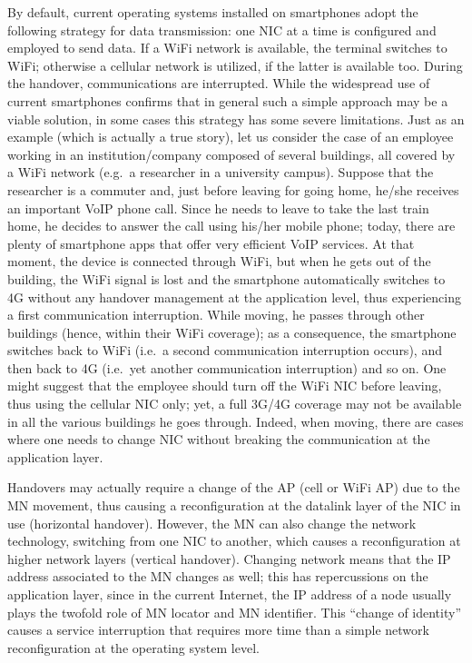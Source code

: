 \documentclass[preprint,12pt]{elsarticle}
\begin{document}
By default, current operating systems installed on smartphones adopt the following strategy for data transmission: one \ac{NIC} at a time is configured and employed 
to send data. If a WiFi network is available, the terminal switches to WiFi; otherwise a cellular network is 
utilized, if the latter is available too. 
During the handover, communications are interrupted. While the widespread use
of current smartphones confirms that in general such a simple approach may be a viable solution, in some cases this strategy has some severe limitations.
Just as an example (which is actually a true story), let us consider the case of an employee working in an institution/company composed of several buildings, all covered by a WiFi network (e.g.~a researcher in a university campus). 
Suppose that the researcher is a commuter and, just before leaving for going home, he/she receives an important \ac{VoIP} 
phone call. Since he needs to leave to take the last train home, he decides to answer the 
call using his/her mobile phone; today, there are plenty of smartphone apps that 
offer very efficient VoIP services.
At that moment, the device is connected through WiFi, but when he gets out of the 
building, the WiFi signal is lost and the smartphone automatically switches to 4G without any handover management at the application level, 
thus experiencing a first communication interruption.  
While moving, he passes through other buildings (hence, within their WiFi 
coverage); as a consequence, the smartphone switches back to WiFi 
(i.e.~a second communication interruption occurs), and then back to 4G 
(i.e.~yet another communication interruption) and so on. 
One might suggest that the employee should turn off the WiFi NIC before leaving, thus using the cellular NIC only; yet, a full 3G/4G coverage may not be available in all the various buildings he goes through.
Indeed, when moving, there are cases where one needs to change NIC without breaking the communication at the application layer.

Handovers may actually require a change of the \ac{AP} (cell or WiFi AP) due to the MN 
movement, thus causing a reconfiguration at the datalink layer of the \ac{NIC} 
in use (horizontal handover). However, the MN can also change the network technology, 
switching from one \ac{NIC} to another, which causes a reconfiguration at 
higher network layers (vertical handover). 
Changing network means that the IP address associated to the \ac{MN} changes as well; 
this has repercussions on the application layer, since in the current Internet, 
the IP address of a node usually plays the twofold role of MN locator and MN 
identifier. 
This ``change of identity'' causes a service interruption that requires more 
time than a simple network reconfiguration at the operating system 
level. 
\end{document}
